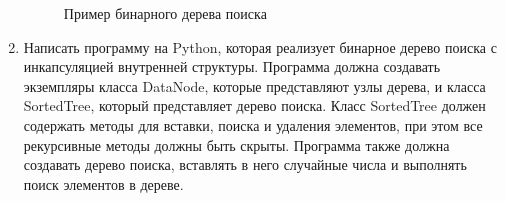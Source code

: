 \begin{enumerate}
\begin{figure}[h]
\centering
{}
\caption{Пример бинарного дерева поиска}
\end{figure}

\item Написать программу на Python, которая реализует бинарное дерево поиска с инкапсуляцией внутренней структуры. Программа должна создавать экземпляры класса DataNode, которые представляют узлы дерева, и класса SortedTree, который представляет дерево поиска. Класс SortedTree должен содержать методы для вставки, поиска и удаления элементов, при этом все рекурсивные методы должны быть скрыты. Программа также должна создавать дерево поиска, вставлять в него случайные числа и выполнять поиск элементов в дереве.


\end{enumerate}
